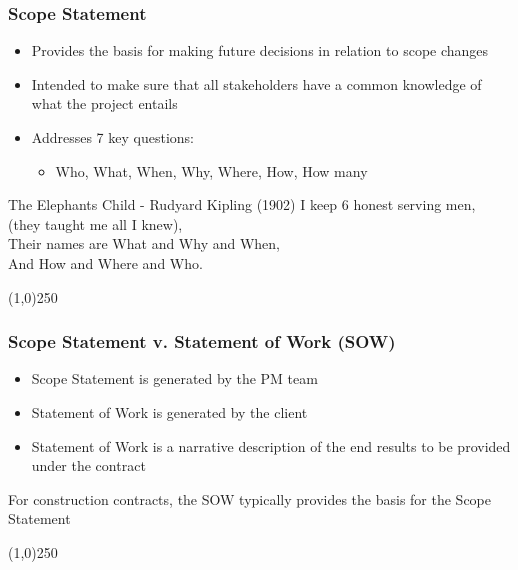 \begin{frame}
\frametitle{Scope Statement}
\begin{itemize}
	\item Provides the basis for making future decisions in relation to scope changes
	\item Intended to make sure that all stakeholders have a common knowledge of what the project entails
	\item Addresses 7 key questions:
	\begin{itemize}
		\item Who, What, When, Why, Where, How, How many
	\end{itemize}
\end{itemize}
\begin{block}{The Elephants Child - Rudyard Kipling (1902)}
I keep 6 honest serving men,\\
	\hspace{2cm}(they taught me all I knew),\\
Their names are What and Why and When,\\
	\hspace{2cm} And How and Where and Who.\\
\end{block}
\end{frame}\begin{center}\line(1,0){250}\end{center}



\begin{frame}
\frametitle{Scope Statement v. Statement of Work (SOW)}
\begin{itemize}
	\item Scope Statement is generated by the PM team
	\item Statement of Work is generated by the client
	\item Statement of Work is a narrative description of the end results to be provided under the contract
\end{itemize}
For construction contracts, the SOW typically provides the basis for the Scope Statement
\end{frame}\begin{center}\line(1,0){250}\end{center}



